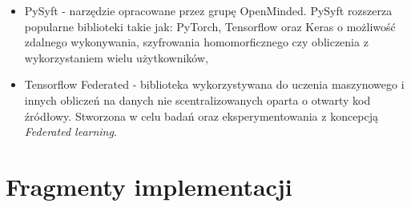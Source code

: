 \begin{itemize}
    \item PySyft - narzędzie opracowane przez grupę OpenMinded. PySyft rozszerza popularne biblioteki takie jak: PyTorch, Tensorflow oraz Keras o możliwość zdalnego wykonywania, szyfrowania homomorficznego czy obliczenia z wykorzystaniem wielu użytkowników,
    \item Tensorflow Federated - biblioteka wykorzystywana do uczenia maszynowego i innych obliczeń na danych nie scentralizowanych oparta o otwarty kod źródłowy. Stworzona w celu badań oraz eksperymentowania z koncepcją \textit{Federated learning}.
\end{itemize}

\section{Fragmenty implementacji}
